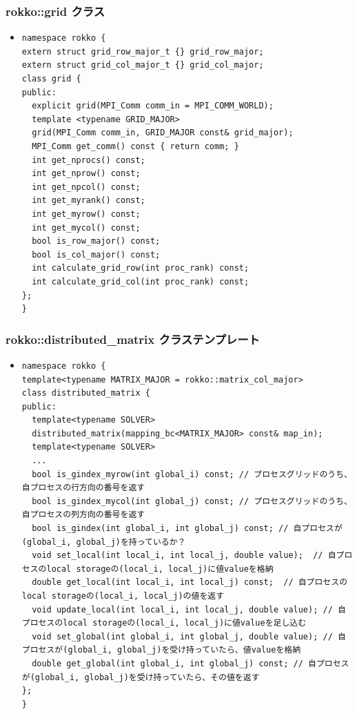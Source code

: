 \begin{frame}[c,fragile]
  \frametitle{rokko::grid クラス}
  \begin{itemize}
  \item {}
\begin{lstlisting}
namespace rokko {
extern struct grid_row_major_t {} grid_row_major;
extern struct grid_col_major_t {} grid_col_major;
class grid {
public:
  explicit grid(MPI_Comm comm_in = MPI_COMM_WORLD);
  template <typename GRID_MAJOR>
  grid(MPI_Comm comm_in, GRID_MAJOR const& grid_major);
  MPI_Comm get_comm() const { return comm; }
  int get_nprocs() const;
  int get_nprow() const;
  int get_npcol() const;
  int get_myrank() const;
  int get_myrow() const;
  int get_mycol() const;
  bool is_row_major() const;
  bool is_col_major() const;
  int calculate_grid_row(int proc_rank) const;
  int calculate_grid_col(int proc_rank) const;
};
}
\end{lstlisting}
  \end{itemize}
\end{frame}


\begin{frame}[c,fragile]
  \frametitle{rokko::distributed_matrix クラステンプレート}
  \begin{itemize}
  \item {}
\begin{lstlisting}
namespace rokko {
template<typename MATRIX_MAJOR = rokko::matrix_col_major>
class distributed_matrix {
public:
  template<typename SOLVER>
  distributed_matrix(mapping_bc<MATRIX_MAJOR> const& map_in);
  template<typename SOLVER>
  ...
  bool is_gindex_myrow(int global_i) const; // プロセスグリッドのうち、自プロセスの行方向の番号を返す
  bool is_gindex_mycol(int global_j) const; // プロセスグリッドのうち、自プロセスの列方向の番号を返す
  bool is_gindex(int global_i, int global_j) const; // 自プロセスが(global_i, global_j)を持っているか？
  void set_local(int local_i, int local_j, double value);  // 自プロセスのlocal storageの(local_i, local_j)に値valueを格納
  double get_local(int local_i, int local_j) const;  // 自プロセスのlocal storageの(local_i, local_j)の値を返す
  void update_local(int local_i, int local_j, double value); // 自プロセスのlocal storageの(local_i, local_j)に値valueを足し込む
  void set_global(int global_i, int global_j, double value); // 自プロセスが(global_i, global_j)を受け持っていたら、値valueを格納
  double get_global(int global_i, int global_j) const; // 自プロセスが(global_i, global_j)を受け持っていたら、その値を返す
};
}
\end{lstlisting}
  \end{itemize}
\end{frame}

